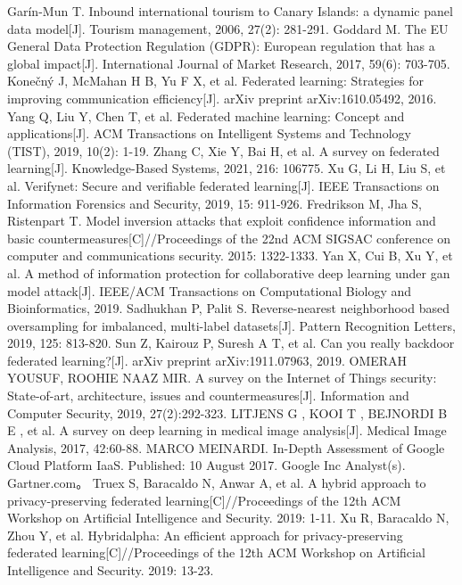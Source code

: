 \documentclass[12pt,openany,a4paper,fancyhdr,oneside]{ctexbook}
\begin{document}
\begin{thebibliography}{99}

Garín-Mun T. Inbound international tourism to Canary Islands: a dynamic panel data model[J]. Tourism management, 2006, 27(2): 281-291.
Goddard M. The EU General Data Protection Regulation (GDPR): European regulation that has a global impact[J]. International Journal of Market Research, 2017, 59(6): 703-705.
Konečný J, McMahan H B, Yu F X, et al. Federated learning: Strategies for improving communication efficiency[J]. arXiv preprint arXiv:1610.05492, 2016.
Yang Q, Liu Y, Chen T, et al. Federated machine learning: Concept and applications[J]. ACM Transactions on Intelligent Systems and Technology (TIST), 2019, 10(2): 1-19.
Zhang C, Xie Y, Bai H, et al. A survey on federated learning[J]. Knowledge-Based Systems, 2021, 216: 106775.
Xu G, Li H, Liu S, et al. Verifynet: Secure and verifiable federated learning[J]. IEEE Transactions on Information Forensics and Security, 2019, 15: 911-926.
Fredrikson M, Jha S, Ristenpart T. Model inversion attacks that exploit confidence information and basic countermeasures[C]//Proceedings of the 22nd ACM SIGSAC conference on computer and communications security. 2015: 1322-1333.
Yan X, Cui B, Xu Y, et al. A method of information protection for collaborative deep learning under gan model attack[J]. IEEE/ACM Transactions on Computational Biology and Bioinformatics, 2019.
Sadhukhan P, Palit S. Reverse-nearest neighborhood based oversampling for imbalanced, multi-label datasets[J]. Pattern Recognition Letters, 2019, 125: 813-820.
Sun Z, Kairouz P, Suresh A T, et al. Can you really backdoor federated learning?[J]. arXiv preprint arXiv:1911.07963, 2019.
OMERAH  YOUSUF,  ROOHIE  NAAZ  MIR.  A  survey  on  the  Internet  of  Things 
security:  State-of-art,  architecture,  issues  and  countermeasures[J].  Information  and 
Computer Security, 2019, 27(2):292-323. 
LITJENS G , KOOI T , BEJNORDI B E , et al. A survey on deep learning in medical 
image analysis[J]. Medical Image Analysis, 2017, 42:60-88. 
MARCO MEINARDI. In-Depth Assessment of Google Cloud Platform IaaS. Published: 
10 August 2017. Google Inc Analyst(s). Gartner.com。
Truex S, Baracaldo N, Anwar A, et al. A hybrid approach to privacy-preserving federated learning[C]//Proceedings of the 12th ACM Workshop on Artificial Intelligence and Security. 2019: 1-11.
Xu R, Baracaldo N, Zhou Y, et al. Hybridalpha: An efficient approach for privacy-preserving federated learning[C]//Proceedings of the 12th ACM Workshop on Artificial Intelligence and Security. 2019: 13-23.

\end{thebibliography}
\end{document}
